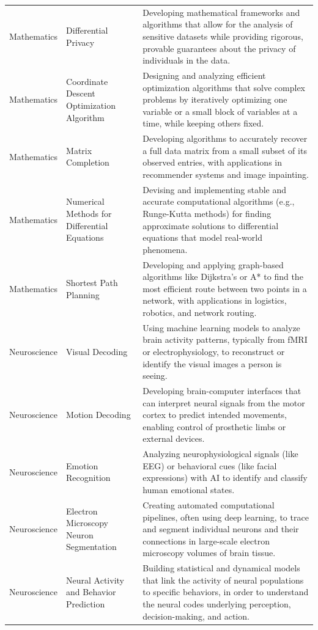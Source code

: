 \begin{longtable}{p{2cm}p{6cm}p{7cm}}
\rowcolor{MathColor} Mathematics & Differential Privacy & Developing mathematical frameworks and algorithms that allow for the analysis of sensitive datasets while providing rigorous, provable guarantees about the privacy of individuals in the data. \\
\rowcolor{MathColor} Mathematics & Coordinate Descent Optimization Algorithm & Designing and analyzing efficient optimization algorithms that solve complex problems by iteratively optimizing one variable or a small block of variables at a time, while keeping others fixed. \\
\rowcolor{MathColor} Mathematics & Matrix Completion & Developing algorithms to accurately recover a full data matrix from a small subset of its observed entries, with applications in recommender systems and image inpainting. \\
\rowcolor{MathColor} Mathematics & Numerical Methods for Differential Equations & Devising and implementing stable and accurate computational algorithms (e.g., Runge-Kutta methods) for finding approximate solutions to differential equations that model real-world phenomena. \\
\rowcolor{MathColor} Mathematics & Shortest Path Planning & Developing and applying graph-based algorithms like Dijkstra's or A* to find the most efficient route between two points in a network, with applications in logistics, robotics, and network routing. \\

\rowcolor{NeuroColor} Neuroscience & Visual Decoding & Using machine learning models to analyze brain activity patterns, typically from fMRI or electrophysiology, to reconstruct or identify the visual images a person is seeing. \\
\rowcolor{NeuroColor} Neuroscience & Motion Decoding & Developing brain-computer interfaces that can interpret neural signals from the motor cortex to predict intended movements, enabling control of prosthetic limbs or external devices. \\
\rowcolor{NeuroColor} Neuroscience & Emotion Recognition & Analyzing neurophysiological signals (like EEG) or behavioral cues (like facial expressions) with AI to identify and classify human emotional states. \\
\rowcolor{NeuroColor} Neuroscience & Electron Microscopy Neuron Segmentation & Creating automated computational pipelines, often using deep learning, to trace and segment individual neurons and their connections in large-scale electron microscopy volumes of brain tissue. \\
\rowcolor{NeuroColor} Neuroscience & Neural Activity and Behavior Prediction & Building statistical and dynamical models that link the activity of neural populations to specific behaviors, in order to understand the neural codes underlying perception, decision-making, and action. \\


\end{longtable}
